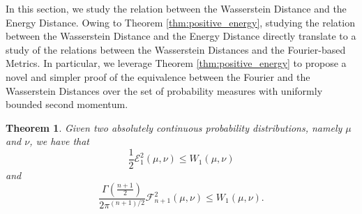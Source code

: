 \documentclass{article}
\renewcommand{\le}{\leqslant}
\newtheorem{theorem}{Theorem}
\begin{document}
% 
In this section, we study the relation between the Wasserstein Distance and the Energy Distance.
% 
Owing to Theorem \ref{thm:positive_energy}, studying the relation between the Wasserstein Distance and the Energy Distance directly translate to a study of the relations between the Wasserstein Distances and the Fourier-based Metrics.
% 
In particular, we leverage Theorem \ref{thm:positive_energy} to propose a novel and simpler proof of the equivalence between the Fourier and the Wasserstein Distances over the set of probability measures with uniformly bounded second momentum.


\begin{theorem}
    Given two absolutely continuous probability distributions, namely $\mu$ and $\nu$, we have that
    \begin{equation}
        \frac{1}{2}\mathcal{E}^2_1(\mu,\nu)\le W_1(\mu,\nu)
    \end{equation}
    and
    \begin{equation}
        \frac{\Gamma\left(\frac{n+1}2\right)}{2\pi^{(n+1)/2}}\mathcal{F}^2_{n+1}(\mu,\nu)\le W_1(\mu,\nu).
    \end{equation}
\end{theorem}
\end{document}
